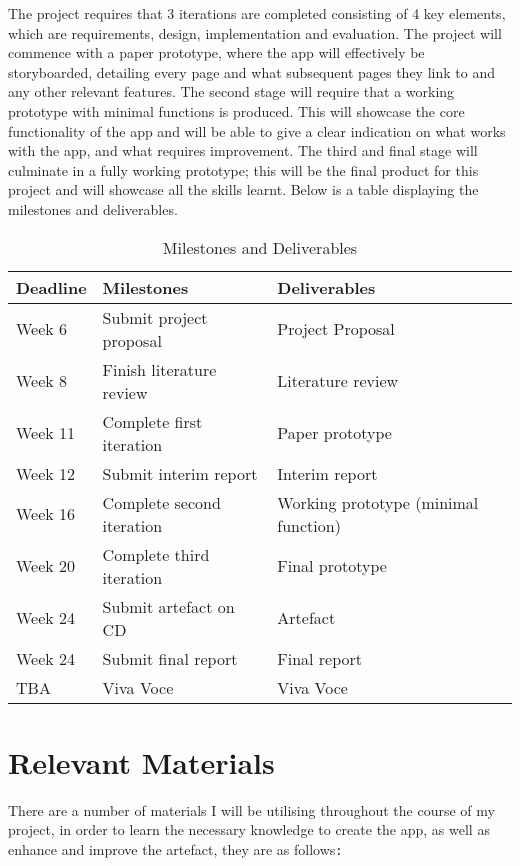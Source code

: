 \documentclass{article}
\begin{document}
The project requires that 3 iterations are completed consisting of 4 key elements, which are requirements, design, implementation and evaluation. The project will commence with a paper prototype, where the app will effectively be storyboarded, detailing every page and what subsequent pages they link to and any other relevant features.
The second stage will require that a working prototype with minimal functions is produced. This will showcase the core functionality of the app and will be able to give a clear indication on what works with the app, and what requires improvement.
The third and final stage will culminate in a fully working prototype; this will be the final product for this project and will showcase all the skills learnt.
Below is a table displaying the milestones and deliverables.

\begin{figure}[H]
\centering
\end{figure}

\begin{table}[H]
	\centering
	\begin{tabular}{| l | l | l |}
\hline
Deadline & 	Milestones & 				Deliverables \\
\hline
Week 6   & 	Submit project proposal &		Project Proposal \\
Week 8 &		Finish literature review &		Literature review \\
Week 11 &	Complete first iteration &		Paper prototype \\
Week 12 &	Submit interim report &		Interim report \\
Week 16 &	Complete second iteration & 	Working prototype (minimal function) \\
Week 20 &	Complete third iteration &		Final prototype \\
Week 24 &	Submit artefact on CD & 		Artefact \\
Week 24 &	Submit final report &			Final report \\
TBA &  		Viva Voce &				Viva Voce \\
\hline

	\end{tabular}
\caption{Milestones and Deliverables}
\end{table}

\section{Relevant Materials}


There are a number of materials I will be utilising throughout the course of my project, in order to learn the necessary knowledge to create the app, as well as enhance and improve the artefact, they are as follows{\texttt{:}}
\end{document}
